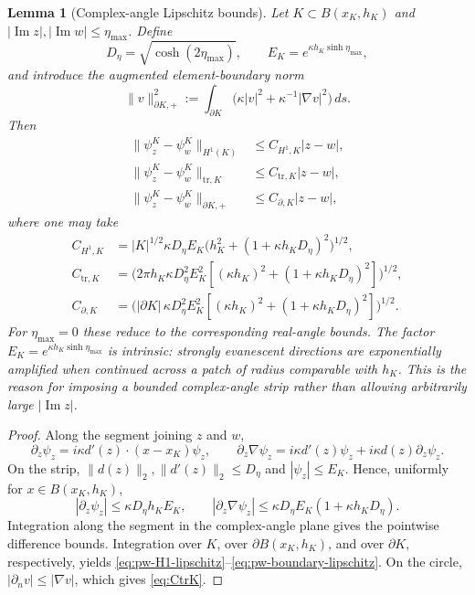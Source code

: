 \documentclass[11pt]{article}
\newtheorem{lemma}[theorem]{Lemma}
\newcommand{\ii}{i}
\renewcommand{\Im}{\operatorname{Im}}
\numberwithin{equation}{section}
\begin{document}
\begin{lemma}[Complex-angle Lipschitz bounds]\label{lem:pw-direction-lipschitz}
Let $K\subset B(x_K,h_K)$ and $|\Im z|,|\Im w|\le\eta_{\max}$.  Define
\[
 D_\eta=\sqrt{\cosh(2\eta_{\max})},
 \qquad E_K=e^{\kappa h_K\sinh\eta_{\max}},
\]
and introduce the augmented element-boundary norm
\begin{equation}\label{eq:boundary-plus-norm}
 \|v\|_{\partial K,+}^2
 :=\int_{\partial K}\big(\kappa|v|^2+\kappa^{-1}|\nabla v|^2\big)\,ds.
\end{equation}
Then
\begin{align}
 \|\psi_z^K-\psi_w^K\|_{H^1(K)}
 &\le C_{H^1,K}|z-w|,\label{eq:pw-H1-lipschitz}\\
 \|\psi_z^K-\psi_w^K\|_{\mathrm{tr},K}
 &\le C_{\mathrm{tr},K}|z-w|,\label{eq:pw-tr-lipschitz}\\
 \|\psi_z^K-\psi_w^K\|_{\partial K,+}
 &\le C_{\partial,K}|z-w|,\label{eq:pw-boundary-lipschitz}
\end{align}
where one may take
\begin{align}
 C_{H^1,K}
 &=|K|^{1/2}\kappa D_\eta E_K
 \Big(h_K^2+(1+\kappa h_KD_\eta)^2\Big)^{1/2},\label{eq:CH1K}\\
 C_{\mathrm{tr},K}
 &=\Big(2\pi h_K\kappa D_\eta^2E_K^2
 [ (\kappa h_K)^2+(1+\kappa h_KD_\eta)^2]\Big)^{1/2},\label{eq:CtrK}\\
 C_{\partial,K}
 &=\Big(|\partial K|\,\kappa D_\eta^2E_K^2
 [ (\kappa h_K)^2+(1+\kappa h_KD_\eta)^2]\Big)^{1/2}.\label{eq:CboundaryK}
\end{align}
For $\eta_{\max}=0$ these reduce to the corresponding real-angle bounds.  The factor $E_K=e^{\kappa h_K\sinh\eta_{\max}}$ is intrinsic: strongly evanescent directions are exponentially amplified when continued across a patch of radius comparable with $h_K$.  This is the reason for imposing a bounded complex-angle strip rather than allowing arbitrarily large $|\Im z|$.
\end{lemma}
\begin{proof}
Along the segment joining $z$ and $w$,
\[
 \partial_z\psi_z=\ii\kappa d'(z)\cdot(x-x_K)\psi_z,
 \qquad
 \partial_z\nabla\psi_z=\ii\kappa d'(z)\psi_z+\ii\kappa d(z)\partial_z\psi_z.
\]
On the strip, $\|d(z)\|_2,\|d'(z)\|_2\le D_\eta$ and $|\psi_z|\le E_K$.  Hence, uniformly for $x\in B(x_K,h_K)$,
\[
 |\partial_z\psi_z|\le \kappa D_\eta h_KE_K,
 \qquad
 |\partial_z\nabla\psi_z|\le \kappa D_\eta E_K(1+\kappa h_KD_\eta).
\]
Integration along the segment in the complex-angle plane gives the pointwise difference bounds.  Integration over $K$, over $\partial B(x_K,h_K)$, and over $\partial K$, respectively, yields \eqref{eq:pw-H1-lipschitz}--\eqref{eq:pw-boundary-lipschitz}.  On the circle, $|\partial_n v|\le|\nabla v|$, which gives \eqref{eq:CtrK}.
\end{proof}
\end{document}
